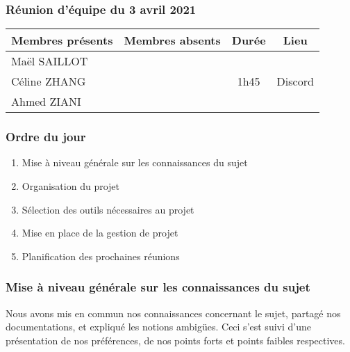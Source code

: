 


% 
\subsubsection*{\large{Réunion d'équipe du 3 avril 2021}}
\begin{center}
\begin{tabular}{| l | l || c | c |}
    \hline
    Membres présents & Membres absents & Durée & Lieu \\
    \hline
    Maël SAILLOT & & & \\ Céline ZHANG & & 1h45 & Discord \\ Ahmed ZIANI & & & \\
    \hline
\end{tabular}
\end{center}

\subsubsection*{Ordre du jour}
\begin{enumerate}
    \item Mise à niveau générale sur les connaissances du sujet
    \item Organisation du projet
    \item Sélection des outils nécessaires au projet
    \item Mise en place de la gestion de projet
    \item Planification des prochaines réunions
\end{enumerate}

\subsubsection*{Mise à niveau générale sur les connaissances du sujet}
Nous avons mis en commun nos connaissances concernant le sujet, partagé nos documentations, et expliqué les notions ambigües. Ceci s'est suivi d'une présentation de nos préférences, de nos points forts et points faibles respectives.

